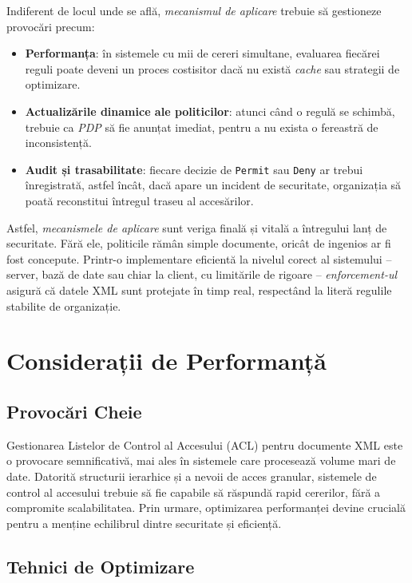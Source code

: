 \documentclass[runningheads]{llncs}
\begin{document}
Indiferent de locul unde se află, \emph{mecanismul de aplicare} trebuie să gestioneze provocări precum:
\begin{itemize}
    \item \textbf{Performanța}: în sistemele cu mii de cereri simultane, evaluarea fiecărei reguli poate deveni un proces costisitor dacă nu există \emph{cache} sau strategii de optimizare.
    \item \textbf{Actualizările dinamice ale politicilor}: atunci când o regulă se schimbă, trebuie ca \emph{PDP} să fie anunțat imediat, pentru a nu exista o fereastră de inconsistență.
    \item \textbf{Audit și trasabilitate}: fiecare decizie de \texttt{Permit} sau \texttt{Deny} ar trebui înregistrată, astfel încât, dacă apare un incident de securitate, organizația să poată reconstitui întregul traseu al accesărilor.
\end{itemize}

Astfel, \emph{mecanismele de aplicare} sunt veriga finală și vitală a întregului lanț de securitate. Fără ele, politicile rămân simple documente, oricât de ingenios ar fi fost concepute. Printr-o implementare eficientă la nivelul corect al sistemului – server, bază de date sau chiar la client, cu limitările de rigoare – \emph{enforcement-ul} asigură că datele XML sunt protejate în timp real, respectând la literă regulile stabilite de organizație.


\section{Considerații de Performanță}
\subsection{Provocări Cheie}

Gestionarea Listelor de Control al Accesului (ACL) pentru documente XML este o provocare semnificativă, mai ales în sistemele care procesează volume mari de date. Datorită structurii ierarhice și a nevoii de acces granular, sistemele de control al accesului trebuie să fie capabile să răspundă rapid cererilor, fără a compromite scalabilitatea. Prin urmare, optimizarea performanței devine crucială pentru a menține echilibrul dintre securitate și eficiență.

\subsection{Tehnici de Optimizare}
\end{document}
